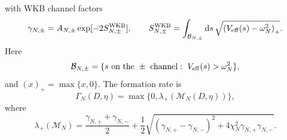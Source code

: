 \documentclass[aps,prd,preprint,notitlepage,nofootinbib,superscriptaddress,floatfix]{revtex4-2}
\newcommand{\dd}{\mathrm{d}}
\newcommand{\cB}{\mathcal B}
\newcommand{\cM}{\mathcal M}
\theoremstyle{remark}
\begin{document}
with WKB channel factors
\begin{equation}
\gamma_{N,\pm}
=
A_{N,\pm}\exp[-2S_{N,\pm}^{\rm WKB}],
\qquad
S_{N,\pm}^{\rm WKB}
=
\int_{\cB_{N,\pm}}\dd s\,
\sqrt{\left(V_{\rm eff}(s)-\omega_N^2\right)_+}.
\label{eq:WKB}
\end{equation}
Here
\begin{equation}
\cB_{N,\pm}
=
\{s\text{ on the } \pm\text{ channel}:\ V_{\rm eff}(s)>\omega_N^2\},
\label{eq:wkb_barrier_region}
\end{equation}
and \((x)_+=\max\{x,0\}\).
The formation rate is
\begin{equation}
\boxed{
\Gamma_N(D,\eta)
=
\max\{0,\lambda_+(\cM_N(D,\eta))\},
}
\label{eq:Gamma}
\end{equation}
where
\begin{equation}
\lambda_+(\cM_N)
=
\frac{\gamma_{N,+}+\gamma_{N,-}}{2}
+\frac12
\sqrt{
(\gamma_{N,+}-\gamma_{N,-})^2
+4\chi_N^2\gamma_{N,+}\gamma_{N,-}
}.
\end{equation}
\end{document}
